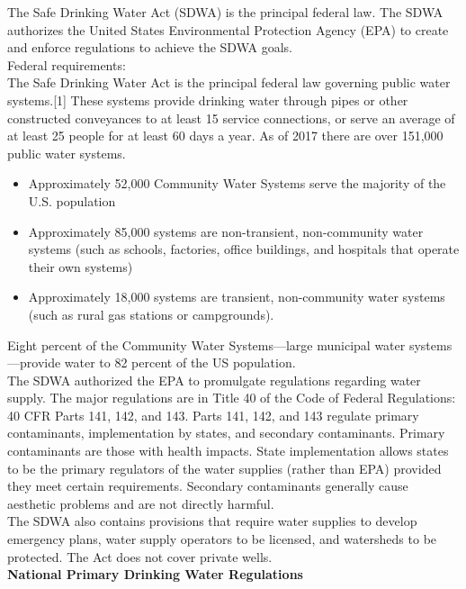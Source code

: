 The Safe Drinking Water Act (SDWA) is the principal federal law. The SDWA authorizes the United States Environmental Protection Agency (EPA) to create and enforce regulations to achieve the SDWA goals.\\

Federal requirements:\\
The Safe Drinking Water Act is the principal federal law governing public water systems.[1] These systems provide drinking water through pipes or other constructed conveyances to at least 15 service connections, or serve an average of at least 25 people for at least 60 days a year. As of 2017 there are over 151,000 public water systems.\\
\begin{itemize}
\item Approximately 52,000 Community Water Systems serve the majority of the U.S. population
\item Approximately 85,000 systems are non-transient, non-community water systems (such as schools, factories, office buildings, and hospitals that operate their own systems)
\item Approximately 18,000 systems are transient, non-community water systems (such as rural gas stations or campgrounds).
\end{itemize}
Eight percent of the Community Water Systems—large municipal water systems—provide water to 82 percent of the US population.\\
The SDWA authorized the EPA to promulgate regulations regarding water supply. The major regulations are in Title 40 of the Code of Federal Regulations: 40 CFR Parts 141, 142, and 143. Parts 141, 142, and 143 regulate primary contaminants, implementation by states, and secondary contaminants. Primary contaminants are those with health impacts. State implementation allows states to be the primary regulators of the water supplies (rather than EPA) provided they meet certain requirements. Secondary contaminants generally cause aesthetic problems and are not directly harmful.\\
The SDWA also contains provisions that require water supplies to develop emergency plans, water supply operators to be licensed, and watersheds to be protected. The Act does not cover private wells.\\
\textbf{National Primary Drinking Water Regulations}\\

